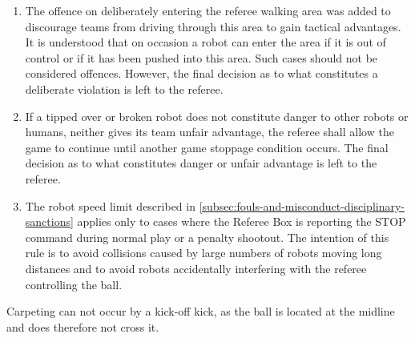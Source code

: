 \begin{enumerate}
\item
The offence on deliberately entering the referee walking area was added to discourage teams from driving through this area to gain tactical advantages.
It is understood that on occasion a robot can enter the area if it is out of control or if it has been pushed into this area.
Such cases should not be considered offences.
However, the final decision as to what constitutes a deliberate violation is left to the referee.

\item
If a tipped over or broken robot does not constitute danger to other robots or humans, neither gives its team unfair advantage, the referee shall allow the game to continue until another game stoppage condition occurs.
The final decision as to what constitutes danger or unfair advantage is left to the referee.

\item
The robot speed limit described in \autoref{subsec:fouls-and-misconduct-disciplinary-sanctions} applies only to cases where the Referee Box is reporting the STOP command during normal play or a penalty shootout.
The intention of this rule is to avoid collisions caused by large numbers of robots moving long distances and to avoid robots accidentally interfering with the referee controlling the ball.
\end{enumerate}

\item
Carpeting can not occur by a kick-off kick, as the ball is located at the midline
and does therefore not cross it.

